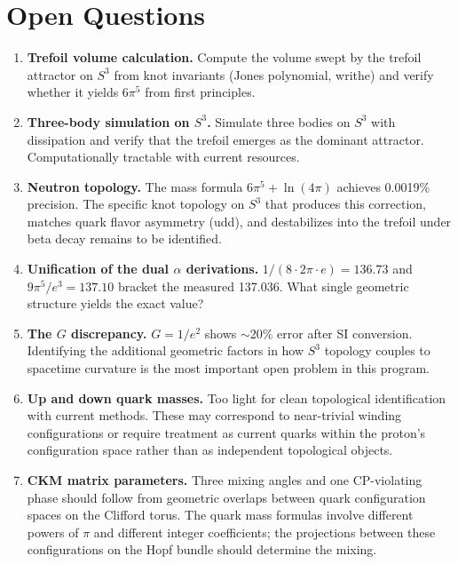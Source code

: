 \documentclass[12pt]{article}
\begin{document}
\section{Open Questions}

\begin{enumerate}

\item \textbf{Trefoil volume calculation.} Compute the volume swept by the trefoil attractor on $S^3$ from knot invariants (Jones polynomial, writhe) and verify whether it yields $6\pi^5$ from first principles.

\item \textbf{Three-body simulation on $S^3$.} Simulate three bodies on $S^3$ with dissipation and verify that the trefoil emerges as the dominant attractor. Computationally tractable with current resources.

\item \textbf{Neutron topology.} The mass formula $6\pi^5 + \ln(4\pi)$ achieves 0.0019\% precision. The specific knot topology on $S^3$ that produces this correction, matches quark flavor asymmetry (udd), and destabilizes into the trefoil under beta decay remains to be identified.

\item \textbf{Unification of the dual $\alpha$ derivations.} $1/(8 \cdot 2\pi \cdot e) = 136.73$ and $9\pi^5/e^3 = 137.10$ bracket the measured 137.036. What single geometric structure yields the exact value?

\item \textbf{The $G$ discrepancy.} $G = 1/e^2$ shows $\sim$20\% error after SI conversion. Identifying the additional geometric factors in how $S^3$ topology couples to spacetime curvature is the most important open problem in this program.

\item \textbf{Up and down quark masses.} Too light for clean topological identification with current methods. These may correspond to near-trivial winding configurations or require treatment as current quarks within the proton's configuration space rather than as independent topological objects.

\item \textbf{CKM matrix parameters.} Three mixing angles and one CP-violating phase should follow from geometric overlaps between quark configuration spaces on the Clifford torus. The quark mass formulas involve different powers of $\pi$ and different integer coefficients; the projections between these configurations on the Hopf bundle should determine the mixing.


\end{enumerate}
\end{document}

